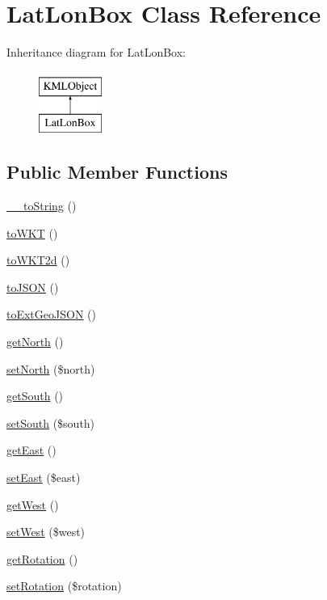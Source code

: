 \hypertarget{classLatLonBox}{
\section{LatLonBox Class Reference}
\label{d6/d2c/classLatLonBox}
}
Inheritance diagram for LatLonBox:\begin{figure}[H]
\begin{center}
\leavevmode
\includegraphics[height=2.000000cm]{d6/d2c/classLatLonBox}
\end{center}
\end{figure}
\subsection*{Public Member Functions}
\begin{DoxyCompactItemize}
\item 
\hyperlink{classLatLonBox_a8767b5979f3abb6e0988f007cd79163a}{\_\-\_\-toString} ()
\item 
\hyperlink{classLatLonBox_a34f1c0a95c4030c120111680782b838e}{toWKT} ()
\item 
\hyperlink{classLatLonBox_ad44a8230baa3cec60f5ed0fcdaf034a7}{toWKT2d} ()
\item 
\hyperlink{classLatLonBox_acdb0ea906f62f49e5703a0959e307349}{toJSON} ()
\item 
\hyperlink{classLatLonBox_a1e58b2118adbc2c8dd26803983c9820d}{toExtGeoJSON} ()
\item 
\hyperlink{classLatLonBox_a5eddadeaf2073ec77b11eb28bd3354f7}{getNorth} ()
\item 
\hyperlink{classLatLonBox_a14aa2c166df87c6a09651f60eec77ea7}{setNorth} (\$north)
\item 
\hyperlink{classLatLonBox_ab77ca24af0563f983e564ef1a059344f}{getSouth} ()
\item 
\hyperlink{classLatLonBox_a3afc27334949ff4045f297e1f92f0bc1}{setSouth} (\$south)
\item 
\hyperlink{classLatLonBox_a42c137e8b129f0b1cce658c40cd51aa0}{getEast} ()
\item 
\hyperlink{classLatLonBox_a3c329b23e56678a20df1b5fe47fb8369}{setEast} (\$east)
\item 
\hyperlink{classLatLonBox_a695828ec7d4de0e8b469f2d93362c40b}{getWest} ()
\item 
\hyperlink{classLatLonBox_a78900e389f42c27a2dcbe0d3869704db}{setWest} (\$west)
\item 
\hyperlink{classLatLonBox_a8c8b2c193a6f48379f0c06b590a6fe13}{getRotation} ()
\item 
\hyperlink{classLatLonBox_ab952507d2480bbce1d7a8b50d8839b1a}{setRotation} (\$rotation)
\end{DoxyCompactItemize}


